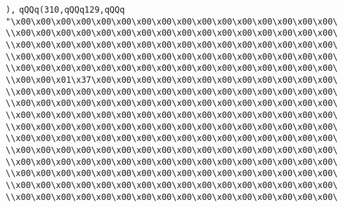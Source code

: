 \verb|),|\newline
\verb|qQQq(310,qQQq129,qQQq|\newline
\verb|"\x00\x00\x00\x00\x00\x00\x00\x00\x00\x00\x00\x00\x00\x00\x00\x00\|\newline
\verb|\\x00\x00\x00\x00\x00\x00\x00\x00\x00\x00\x00\x00\x00\x00\x00\x00\|\newline
\verb|\\x00\x00\x00\x00\x00\x00\x00\x00\x00\x00\x00\x00\x00\x00\x00\x00\|\newline
\verb|\\x00\x00\x00\x00\x00\x00\x00\x00\x00\x00\x00\x00\x00\x00\x00\x00\|\newline
\verb|\\x00\x00\x00\x00\x00\x00\x00\x00\x00\x00\x00\x00\x00\x00\x00\x00\|\newline
\verb|\\x00\x00\x01\x37\x00\x00\x00\x00\x00\x00\x00\x00\x00\x00\x00\x00\|\newline
\verb|\\x00\x00\x00\x00\x00\x00\x00\x00\x00\x00\x00\x00\x00\x00\x00\x00\|\newline
\verb|\\x00\x00\x00\x00\x00\x00\x00\x00\x00\x00\x00\x00\x00\x00\x00\x00\|\newline
\verb|\\x00\x00\x00\x00\x00\x00\x00\x00\x00\x00\x00\x00\x00\x00\x00\x00\|\newline
\verb|\\x00\x00\x00\x00\x00\x00\x00\x00\x00\x00\x00\x00\x00\x00\x00\x00\|\newline
\verb|\\x00\x00\x00\x00\x00\x00\x00\x00\x00\x00\x00\x00\x00\x00\x00\x00\|\newline
\verb|\\x00\x00\x00\x00\x00\x00\x00\x00\x00\x00\x00\x00\x00\x00\x00\x00\|\newline
\verb|\\x00\x00\x00\x00\x00\x00\x00\x00\x00\x00\x00\x00\x00\x00\x00\x00\|\newline
\verb|\\x00\x00\x00\x00\x00\x00\x00\x00\x00\x00\x00\x00\x00\x00\x00\x00\|\newline
\verb|\\x00\x00\x00\x00\x00\x00\x00\x00\x00\x00\x00\x00\x00\x00\x00\x00\|\newline
\verb|\\x00\x00\x00\x00\x00\x00\x00\x00\x00\x00\x00\x00\x00\x00\x00\x00\|\newline
